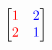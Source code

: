 \documentclass[preview]{standalone}
\begin{document}
\begin{align*}
\begin{bmatrix} {\color{red}1} & {\color{blue}2} \\ {\color{red}2} & {\color{blue}1} \end{bmatrix}
\end{align*}
\end{document}
